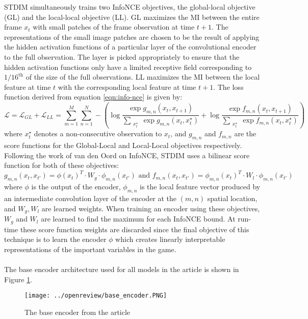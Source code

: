 STDIM simultaneously trains two InfoNCE objectives, the global-local objective (GL) and the local-local objective (LL). GL maximizes the MI between the entire frame $x_t$ with small patches of the frame observation at time $t+1$. The representations of the small image patches are chosen to be the result of applying the hidden activation functions of a particular layer of the convolutional encoder to the full observation. The layer is picked appropriately to ensure that the hidden activation functions only have a limited receptive field corresponding to $1/16^{\text{th}}$ of the size of the full observations. LL maximizes the MI between the local feature at time $t$ with the corresponding local feature at time $t+1$. The loss function derived from equation \ref{eqn:info-nce} is given by:
\begin{equation}
\mathcal{L}=\mathcal{L}_{GL}+\mathcal{L}_{LL}=\sum_{m=1}^M\sum_{n=1}^N-\left(\log{\frac{\exp{g_{m,n}(x_t,x_{t+1})}}{\sum\limits_{\substack{x_t^\star}} \exp{g_{m,n}(x_t,x_t^\star)}}}+\log{\frac{\exp{f_{m,n}(x_t,x_{t+1})}}{\sum\limits_{\substack{x_t^\star}} \exp{f_{m,n}(x_t,x_t^\star)}}}\right)
\label{eqn:loss-functions}
\end{equation}
where $x_t^\star$ denotes a non-consecutive observation to $x_t$, and $g_{m,n}$ and $f_{m,n}$ are the score functions for the Global-Local and Local-Local objectives respectively. Following the work of van den Oord \cite{infoNCE} on InfoNCE, STDIM uses a bilinear score function for both of these objectives: 
\begin{equation}
g_{m,n}(x_t, x_{t'}) = \phi(x_t)^T \cdot W_g \cdot \phi_{m,n}(x_{t'})\text{ and }  f_{m,n}(x_t, x_{t'}) = \phi_{m,n}(x_t)^T\cdot W_l\cdot \phi_{m,n}(x_{t'})
\label{eqn:bilinear}
\end{equation}
where $\phi$ is the output of the encoder, $\phi_{m,n}$ is the local feature vector produced by an intermediate convolution layer of the encoder at the $(m,n)$ spatial location, and $W_g,W_l$ are learned weights. When training an encoder using these objectives, $W_g$ and $W_l$ are learned to find the maximum for each InfoNCE bound. At run-time these score function weights are discarded since the final objective of this technique is to learn the encoder $\phi$ which creates linearly interpretable representations of the important variables in the game.
\\\\
The base encoder architecture used for all models in the article is shown in Figure \ref{fig:base-encoder-image}.
\begin{figure}[H]
    \centering
    \texttt{[image: ../openreview/base\_encoder.PNG]}
    \caption{The base encoder from the article}
    \label{fig:base-encoder-image}
\end{figure}

